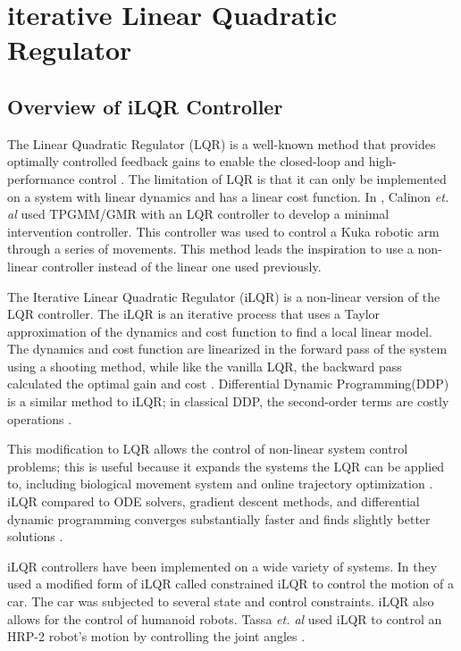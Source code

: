 \section{iterative Linear Quadratic Regulator}

\subsection{Overview of iLQR Controller}

The Linear Quadratic Regulator (LQR) is a well-known method that provides optimally controlled feedback gains to enable the closed-loop and high-performance control \cite{kirk2004optimal}. The limitation of LQR is that it can only be implemented on a system with linear dynamics and has a linear cost function. In \cite{TPGMM_calinon2016}, Calinon \textit{et. al} used TPGMM/GMR with an LQR controller to develop a minimal intervention controller. This controller was used to control a Kuka robotic arm \cite{schreiber2010fast} through a series of movements. This method leads the inspiration to use a non-linear controller instead of the linear one used previously.  

The Iterative Linear Quadratic Regulator (iLQR) is a non-linear version of the LQR controller. The iLQR is an iterative process that uses a Taylor approximation of the dynamics and cost function to find a local linear model. The dynamics and cost function are linearized in the forward pass of the system using a shooting method, while like the vanilla LQR, the backward pass calculated the optimal gain and cost \cite{iLQR_paper}. Differential Dynamic Programming(DDP) is a similar method to iLQR; in classical DDP, the second-order terms are costly operations \cite{iLQR_tassa2014}  \cite{iLQR_Zachary2016}.

This modification to LQR allows the control of non-linear system control problems; this is useful because it expands the systems the LQR can be applied to, including biological movement system \cite{iLQR_Li2004} and online trajectory optimization \cite{iLQR_tassa2012}. iLQR compared to ODE solvers, gradient descent methods, and differential dynamic programming converges substantially faster and finds slightly better solutions \cite{iLQR_Li2004}. 

iLQR controllers have been implemented on a wide variety of systems. In \cite{car} they used a modified form of iLQR called constrained iLQR to control the motion of a car. The car was subjected to several state and control constraints. iLQR also allows for the control of humanoid robots. Tassa \textit{et. al} used iLQR to control an HRP-2 robot's motion by controlling the joint angles \cite{iLQR_tassa2014}.


